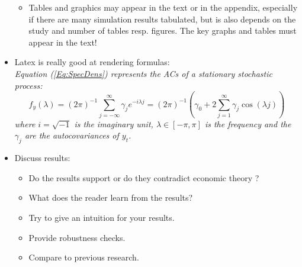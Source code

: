 \begin{itemize}
\begin{itemize}
            \item Tables and graphics may appear in the text or in
                the appendix, especially if there are many simulation results
                tabulated, but is also depends on the study and number of tables resp.
                figures. The key graphs and tables must appear in
                the text!
        \end{itemize}

    \item Latex is really good at rendering formulas:\\
        {\it Equation (\ref{Eq:SpecDens}) represents the ACs of a stationary
        stochastic process:
        \begin{equation}
            f_y(\lambda) = (2\pi)^{-1} \sum_{j=-\infty}^{\infty}
                           \gamma_j e^{-i\lambda j}
                         =(2\pi)^{-1}\left(\gamma_0 + 2 \sum_{j=1}^{\infty}
        \gamma_j \cos(\lambda j)\right)
                                        \label{Eq:SpecDens}
        \end{equation}
        where $i=\sqrt{-1}$ is the imaginary unit, $\lambda \in [-\pi,
        \pi]$ is the frequency and the $\gamma_j$ are the autocovariances
        of $y_t$.}

\newpage

    \item Discuss results:
        \begin{itemize}
            \item Do the results support or do they contradict economic theory ?
            \item What does the reader learn from the results?
            \item Try to give an intuition for your results.
            \item Provide robustness checks.
            \item Compare to previous research.
        \end{itemize}
\end{itemize}
